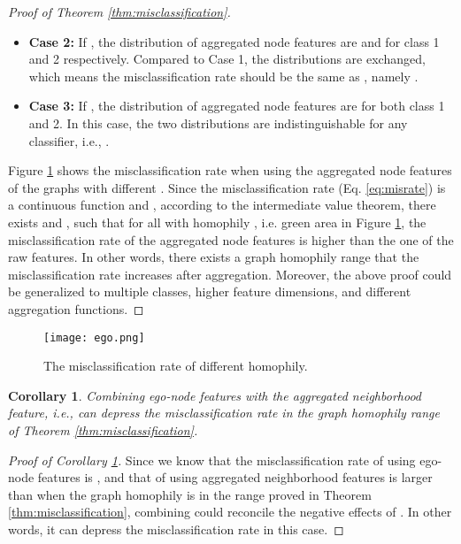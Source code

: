 \documentclass{article}
\theoremstyle{plain}
\newtheorem{corollary}{Corollary}[theorem]
\begin{document}
\begin{proof}[Proof of Theorem \ref{thm:misclassification}]
\begin{itemize}
    \item \textbf{Case 2:} If , the distribution of aggregated node features are  and  for class 1 and 2 respectively. Compared to Case 1, the distributions are exchanged, which means the misclassification rate should be the same as , namely .

    \item \textbf{Case 3:} If , the distribution of aggregated node features are  for both class 1 and 2. In this case, the two distributions are indistinguishable for any classifier, i.e., . 
\end{itemize}

Figure \ref{fig:misrate} shows the misclassification rate when using the aggregated node features of the graphs with different . Since the misclassification rate (Eq. \ref{eq:misrate}) is a continuous function and , according to the intermediate value theorem, there exists  and , such that for all  with homophily , i.e. green area in Figure \ref{fig:misrate}, the misclassification rate of the aggregated node features is higher than the one of the raw features. 
In other words, there exists a graph homophily range that the misclassification rate increases after aggregation. Moreover, the above proof could be generalized to multiple classes, higher feature dimensions, and different aggregation functions.
\end{proof}

\begin{figure}[t]
\centering
\texttt{[image: ego.png]}
\vspace{-10pt}
\caption{The misclassification rate of different homophily.}
\label{fig:misrate}
\end{figure}
\vspace{-8pt}

\begin{corollary} \label{cor:ego}
Combining ego-node features with the aggregated neighborhood feature, i.e.,  can depress the misclassification rate in the graph homophily range of Theorem \ref{thm:misclassification}.
\end{corollary}
\vspace{-10pt}
\begin{proof}[Proof of Corollary \ref{cor:ego}] 
Since we know that the misclassification rate of using ego-node features  is , and that of using aggregated neighborhood features  is larger than  when the graph homophily is in the range proved in Theorem \ref{thm:misclassification}, combining  could reconcile the negative effects of . In other words, it can depress the misclassification rate in this case.
\end{proof}
\end{document}

